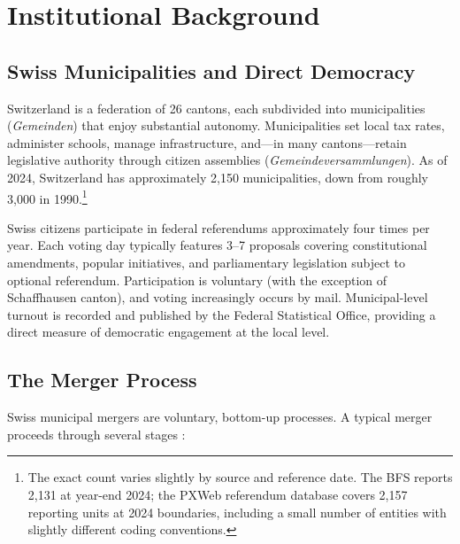 \documentclass[12pt]{article}
\begin{document}
\section{Institutional Background}

\subsection{Swiss Municipalities and Direct Democracy}

Switzerland is a federation of 26 cantons, each subdivided into municipalities (\textit{Gemeinden}) that enjoy substantial autonomy. Municipalities set local tax rates, administer schools, manage infrastructure, and---in many cantons---retain legislative authority through citizen assemblies (\textit{Gemeindeversammlungen}). As of 2024, Switzerland has approximately 2,150 municipalities, down from roughly 3,000 in 1990.\footnote{The exact count varies slightly by source and reference date. The BFS reports 2,131 at year-end 2024; the PXWeb referendum database covers 2,157 reporting units at 2024 boundaries, including a small number of entities with slightly different coding conventions.}

Swiss citizens participate in federal referendums approximately four times per year. Each voting day typically features 3--7 proposals covering constitutional amendments, popular initiatives, and parliamentary legislation subject to optional referendum. Participation is voluntary (with the exception of Schaffhausen canton), and voting increasingly occurs by mail. Municipal-level turnout is recorded and published by the Federal Statistical Office, providing a direct measure of democratic engagement at the local level.

\subsection{The Merger Process}

Swiss municipal mergers are voluntary, bottom-up processes. A typical merger proceeds through several stages \citep{steiner2003gemeindezusammenschluesse}:
\end{document}

